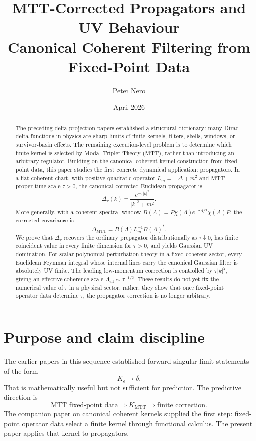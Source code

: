 \documentclass[11pt]{article}
\title{MTT-Corrected Propagators and UV Behaviour\\
\large Canonical Coherent Filtering from Fixed-Point Data}
\author{Peter Nero}
\date{April 2026}
\begin{document}
\maketitle

\begin{abstract}
The preceding delta-projection papers established a structural dictionary: many Dirac delta functions in physics are sharp limits of finite kernels, filters, shells, windows, or survivor-basin effects. The remaining execution-level problem is to determine which finite kernel is selected by Modal Triplet Theory (MTT), rather than introducing an arbitrary regulator. Building on the canonical coherent-kernel construction from fixed-point data, this paper studies the first concrete dynamical application: propagators. In a flat coherent chart, with positive quadratic operator \(L_m=-\Delta+m^2\) and MTT proper-time scale \(\tau>0\), the canonical corrected Euclidean propagator is
\[
        \Delta_\tau(k)=\frac{e^{-\tau |k|^2}}{|k|^2+m^2}.
\]
More generally, with a coherent spectral window \(B(A)=P\chi(A)e^{-\tau A/2}\chi(A)P\), the corrected covariance is
\[
        \Delta_{\mathrm{MTT}} = B(A)L_m^{-1}B(A)^\ast .
\]
We prove that \(\Delta_\tau\) recovers the ordinary propagator distributionally as \(\tau\downarrow0\), has finite coincident value in every finite dimension for \(\tau>0\), and yields Gaussian UV domination. For scalar polynomial perturbation theory in a fixed coherent sector, every Euclidean Feynman integral whose internal lines carry the canonical Gaussian filter is absolutely UV finite. The leading low-momentum correction is controlled by \(\tau |k|^2\), giving an effective coherence scale \(\Lambda_{\mathrm{eff}}\sim\tau^{-1/2}\). These results do not yet fix the numerical value of \(\tau\) in a physical sector; rather, they show that once fixed-point operator data determine \(\tau\), the propagator correction is no longer arbitrary.
\end{abstract}

\tableofcontents

\section{Purpose and claim discipline}

The earlier papers in this sequence established forward singular-limit statements of the form
\[
        K_\epsilon \longrightarrow \delta .
\]
That is mathematically useful but not sufficient for prediction. The predictive direction is
\[
        \text{MTT fixed-point data}
        \Longrightarrow
        K_{\mathrm{MTT}}
        \Longrightarrow
        \text{finite correction}.
\]
The companion paper on canonical coherent kernels supplied the first step: fixed-point operator data select a finite kernel through functional calculus. The present paper applies that kernel to propagators.
\end{document}
